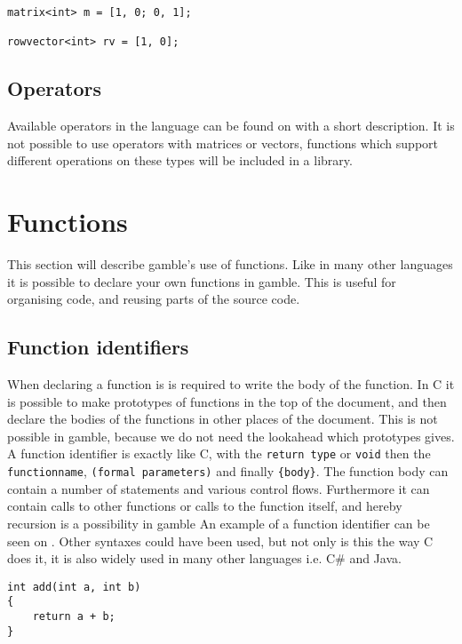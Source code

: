 \begin{lstlisting}[caption={Creating a matrix},label={lst:matrix},numbers=none]
matrix<int> m = [1, 0; 0, 1];

rowvector<int> rv = [1, 0];
\end{lstlisting}

\subsection*{Operators}
Available operators in the language can be found on  with a short description.  
It is not possible to use operators with matrices or vectors, functions which support different operations on these types will be included in a library.


\section{Functions}
This section will describe \gls{gamble}'s use of functions. 
Like in many other languages it is possible to declare your own functions in \gls{gamble}.
This is useful for organising code, and reusing parts of the source code.

\subsection*{Function identifiers}
When declaring a function is is required to write the body of the function.
In C it is possible to make prototypes of functions in the top of the document, and then declare the bodies of the functions in other places of the document. 
This is not possible in \gls{gamble}, because we do not need the lookahead which prototypes gives.
A function identifier is exactly like C, with the \texttt{return type} or \texttt{void} then the \texttt{functionname}, \texttt{(formal parameters)} and finally \texttt{\{body\}}.
The function body can contain a number of statements and various control flows.
Furthermore it can contain calls to other functions or calls to the function itself, and hereby recursion is a possibility in \gls{gamble}
An example of a function identifier can be seen on .
Other syntaxes could have been used, but not only is this the way C does it, it is also widely used in many other languages i.e. C\# and Java.

\begin{lstlisting}[caption={Function Identifier},label={lst:functionID},numbers=none]                                                        
int add(int a, int b)
{
	return a + b;
}
\end{lstlisting}

